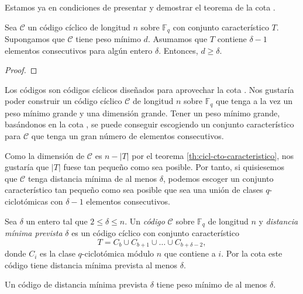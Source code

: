 Estamos ya en condiciones de presentar y demostrar el teorema de la cota .

\begin{theorem}
  Sea \(\mathcal C\) un código cíclico de longitud \(n\) sobre \(\mathbb F_q\) con conjunto característico \(T\).
  Supongamos que \(\mathcal C\) tiene peso mínimo \(d\).
  Asumamos que \(T\) contiene \(\delta - 1\) elementos consecutivos para algún entero \(\delta\).
  Entonces, \(d \geq \delta\).
\end{theorem}

\begin{proof}
  
\end{proof}

Los códigos  son códigos cíclicos diseñados para aprovechar la cota .
Nos gustaría poder construir un código cíclico \(\mathcal C\) de longitud \(n\) sobre \(\mathbb F_q\) que tenga a la vez un peso mínimo grande y una dimensión grande.
Tener un peso mínimo grande, basándonos en la cota , se puede conseguir escogiendo un conjunto característico para \(\mathcal C\) que tenga un gran número de elementos consecutivos.

Como la dimensión de \(\mathcal C\) es \(n - |T|\) por el teorema \ref{th:cicl-cto-caracteristico}, nos gustaría que \(|T|\) fuese tan pequeño como sea posible.
Por tanto, si quisiesemos que \(\mathcal C\) tenga distancia mínima de al menos \(\delta\), podemos escoger un conjunto característico tan pequeño como sea posible que sea una unión de clases \(q\)-ciclotómicas con \(\delta - 1\) elementos consecutivos.

Sea \(\delta\) un entero tal que \(2 \leq \delta \leq n\). Un \textit{código } \(\mathcal C\) sobre \(\mathbb F_q\) de longitud \(n\) y \textit{distancia mínima prevista} \(\delta\) es un código cíclico con conjunto característico
\begin{equation}
  \label{eq:bch-conjunto-caracteristico}
  T = C_b \cup C_{b+1} \cup \dots \cup C_{b + \delta - 2},
\end{equation}
donde \(C_i\) es la clase \(q\)-ciclotómica módulo \(n\) que contiene a \(i\).
Por la cota  este código tiene distancia mínima prevista al menos \(\delta\).

\begin{theorem}
  Un código  de distancia mínima prevista \(\delta\) tiene peso mínimo de al menos \(\delta\).
\end{theorem}

